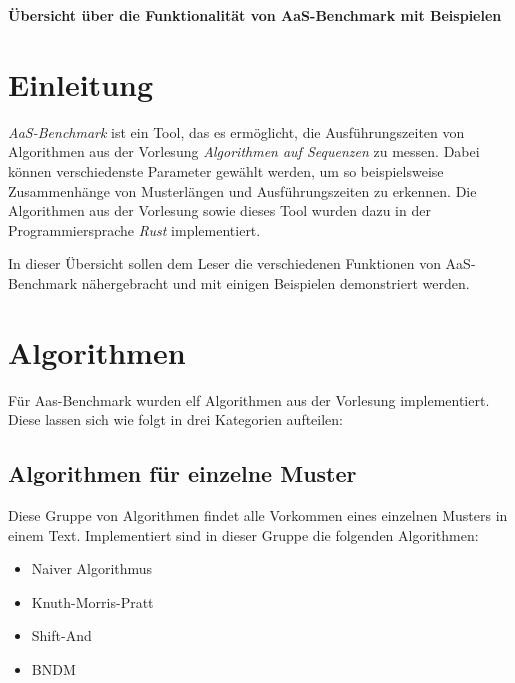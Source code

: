 \documentclass{article}
\begin{document}
\begin{center}
    \large \textbf{Übersicht über die Funktionalität von AaS-Benchmark mit Beispielen}
\end{center}

\vspace{2em}

\begin{multicols*}{2}
    {\setlength{\parskip}{0em} \tableofcontents}

    \section{Einleitung}

    \textit{AaS-Benchmark} ist ein Tool, das es ermöglicht, die Ausführungszeiten von Algorithmen aus der Vorlesung \textit{Algorithmen auf Sequenzen} zu messen. Dabei können verschiedenste Parameter gewählt werden, um so beispielsweise Zusammenhänge von Musterlängen und Ausführungszeiten zu erkennen. Die Algorithmen aus der Vorlesung sowie dieses Tool wurden dazu in der Programmiersprache \textit{Rust} implementiert.
    
    In dieser Übersicht sollen dem Leser die verschiedenen Funktionen von AaS-Benchmark nähergebracht und mit einigen Beispielen demonstriert werden.

    \section{Algorithmen}

    Für Aas-Benchmark wurden elf Algorithmen aus der Vorlesung implementiert. Diese lassen sich wie folgt in drei Kategorien aufteilen:

    \subsection{Algorithmen für einzelne Muster}

    Diese Gruppe von Algorithmen findet alle Vorkommen eines einzelnen Musters in einem Text. Implementiert sind in dieser Gruppe die folgenden Algorithmen:

    \begin{itemize}
        \setlength{\parskip}{0em}
        \item Naiver Algorithmus
        \item Knuth-Morris-Pratt
        \item Shift-And
        \item BNDM
    \end{itemize}


\end{multicols*}
\end{document}
